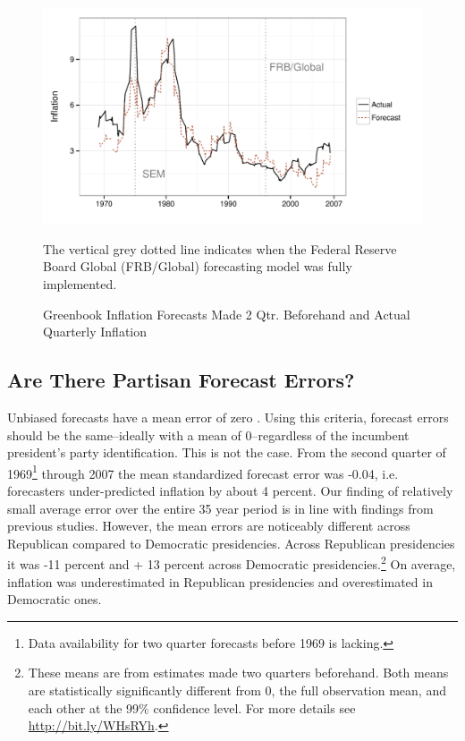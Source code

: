 \documentclass[a4paper]{article}\usepackage{graphicx, color}
\newenvironment{knitrout}{}{} %
\begin{document}
\begin{figure}[t]
    \caption{Greenbook Inflation Forecasts Made 2 Qtr. Beforehand and Actual Quarterly Inflation}
    \label{absolute}
    \begin{center}
    
\begin{knitrout}
\color{fgcolor}

{\centering \includegraphics[width=0.8\linewidth]{figure/BaseInflation} 

}



\end{knitrout}

    
    \end{center}
    \begin{singlespace}
        {\scriptsize{The vertical grey dotted line indicates when the Federal Reserve Board Global (FRB/Global) forecasting model was fully implemented.  
                      }}
    \end{singlespace}
\end{figure}


\subsection{Are There Partisan Forecast Errors?}




Unbiased forecasts have a mean error of zero \citep[5]{Bruck2006}. Using this criteria, forecast errors should be the same--ideally with a mean of 0--regardless of the incumbent president's party identification. This is not the case. From the second quarter of 1969\footnote{Data availability for two quarter forecasts before 1969 is lacking.} through 2007 the mean standardized forecast error was -0.04, i.e. forecasters under-predicted inflation by about 4 percent. Our finding of relatively small average error over the entire 35 year period is in line with findings from previous studies. However, the mean errors are noticeably different across Republican compared to Democratic presidencies. Across Republican presidencies it was -11 percent and + 13 percent across Democratic presidencies.\footnote{These means are from estimates made two quarters beforehand. Both means are statistically significantly different from 0, the full observation mean, and each other at the 99\% confidence level. For more details see \url{http://bit.ly/WHsRYh}.} On average, inflation was underestimated in Republican presidencies and overestimated in Democratic ones.
\end{document}
